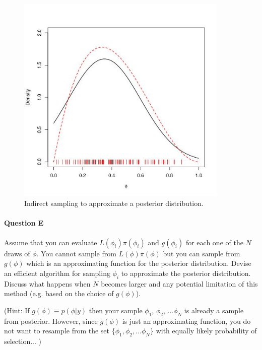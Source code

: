 \begin{figure}[h!]
        \includegraphics[width=0.9\textwidth]{Figures/sampling.jpeg}
	\caption{Indirect sampling to approximate a posterior distribution.}
    \label{fig:approx}
\end{figure}

\paragraph{Question E}

Assume that you can evaluate $L(\phi_i)\pi(\phi_i)$ and $g(\phi_i)$ for each one of the $N$ draws of $\phi$. You cannot sample from $L(\phi)\pi(\phi)$ but you can sample from $g(\phi)$ which is an approximating function for the posterior distribution. Devise an efficient algorithm for sampling $\phi_i$ to approximate the posterior distribution. Discuss what happens when $N$ becomes larger and any potential limitation of this method (e.g. based on the choice of $g(\phi)$).

(Hint: If $g(\phi) \equiv p(\phi|y)$ then your sample $\phi_1$, $\phi_2$, ...$\phi_N$ is already a sample from posterior. However, since $g(\phi)$ is just an approximating function, you do not want to resample from the set $\{\phi_1, \phi_2, ...\phi_N\}$ with equally likely probability of selection... )


